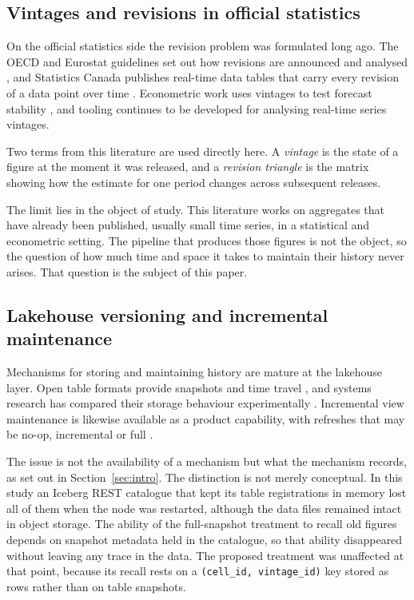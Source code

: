 \documentclass[a4paper,fleqn]{cas-dc}
\begin{document}
\subsection{Vintages and revisions in official statistics}

On the official statistics side the revision problem was formulated long ago.
The OECD and Eurostat guidelines set out how revisions are announced and
analysed \citep{oecd_eurostat_revisions}, and Statistics Canada publishes
real-time data tables that carry every revision of a data point over time
\citep{statcan_realtime}. Econometric work uses vintages to test forecast
stability \citep{ecb2007vintages}, and tooling continues to be developed for
analysing real-time series vintages.

Two terms from this literature are used directly here. A \emph{vintage} is the
state of a figure at the moment it was released, and a \emph{revision triangle}
is the matrix showing how the estimate for one period changes across subsequent
releases.

The limit lies in the object of study. This literature works on aggregates that
have already been published, usually small time series, in a statistical and
econometric setting. The pipeline that produces those figures is not the object,
so the question of how much time and space it takes to maintain their history
never arises. That question is the subject of this paper.

\subsection{Lakehouse versioning and incremental maintenance}

Mechanisms for storing and maintaining history are mature at the lakehouse
layer. Open table formats provide snapshots and time travel
\citep{iceberg_spec}, and systems research has compared their storage behaviour
experimentally \citep{jain2023lhbench,is2025lakehouse}. Incremental view
maintenance is likewise available as a product capability, with refreshes that
may be no-op, incremental or full \citep{fabric_mlv}.

The issue is not the availability of a mechanism but what the mechanism records,
as set out in Section~\ref{sec:intro}. The distinction is not merely conceptual.
In this study an Iceberg REST catalogue that kept its table registrations in
memory lost all of them when the node was restarted, although the data files
remained intact in object storage. The ability of the full-snapshot treatment to
recall old figures depends on snapshot metadata held in the catalogue, so that
ability disappeared without leaving any trace in the data. The proposed
treatment was unaffected at that point, because its recall rests on a
\texttt{(cell\_id, vintage\_id)} key stored as rows rather than on table
snapshots.
\end{document}

